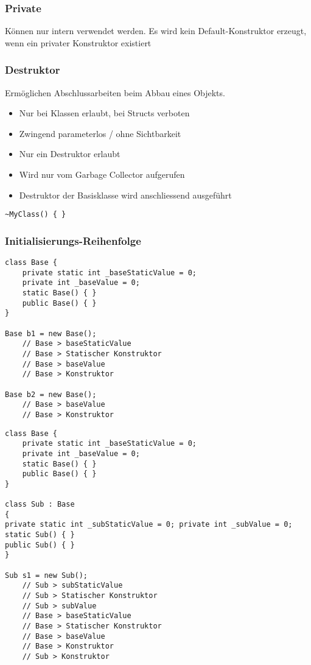 \begin{multicols*}{2}
\subsubsection{Private}
Können nur intern verwendet werden. Es wird kein Default-Konstruktor erzeugt, wenn ein privater Konstruktor existiert
\subsubsection{Destruktor}
Ermöglichen Abschlussarbeiten beim Abbau eines Objekts.
\begin{itemize}
    \item Nur bei Klassen erlaubt, bei Structs verboten
    \item Zwingend parameterlos / ohne Sichtbarkeit
    \item Nur ein Destruktor erlaubt
    \item Wird nur vom Garbage Collector aufgerufen
    \item Destruktor der Basisklasse wird anschliessend ausgeführt
\end{itemize}
\begin{lstlisting}
~MyClass() { }
\end{lstlisting}

\subsubsection{Initialisierungs-Reihenfolge}
\begin{lstlisting}
class Base {
    private static int _baseStaticValue = 0;
    private int _baseValue = 0;
    static Base() { }
    public Base() { }
}

Base b1 = new Base();
    // Base > baseStaticValue
    // Base > Statischer Konstruktor 
    // Base > baseValue
    // Base > Konstruktor

Base b2 = new Base();
    // Base > baseValue 
    // Base > Konstruktor
\end{lstlisting}
\begin{lstlisting}
class Base {
    private static int _baseStaticValue = 0;
    private int _baseValue = 0;
    static Base() { }
    public Base() { }
}

class Sub : Base
{
private static int _subStaticValue = 0; private int _subValue = 0;
static Sub() { }
public Sub() { }
}

Sub s1 = new Sub();
    // Sub > subStaticValue
    // Sub > Statischer Konstruktor 
    // Sub > subValue
    // Base > baseStaticValue
    // Base > Statischer Konstruktor 
    // Base > baseValue
    // Base > Konstruktor
    // Sub > Konstruktor


\end{lstlisting}
\end{multicols*}
